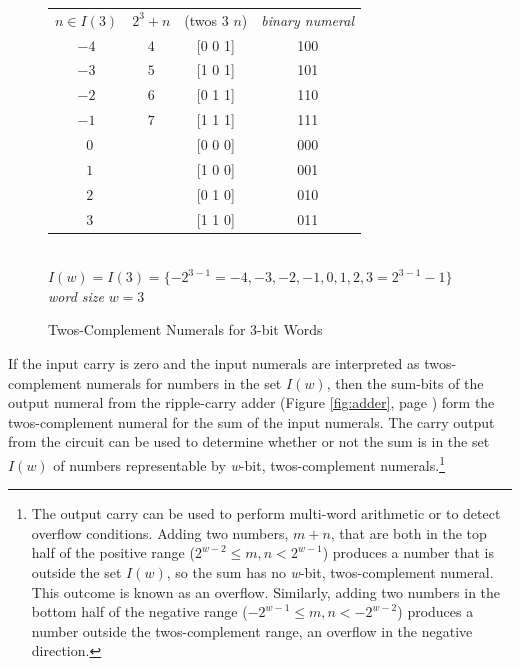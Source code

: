 \begin{figure}
\begin{center}
\begin{tabular}{cccc}
 $n \in I(3)$ & $2^3+n$  & \textsf{(twos $3$ $n$)}   & \emph{binary numeral} \\
 $-4$         & $4$      & \textsf{[0 0 1]}          & 100                   \\
 $-3$         & $5$      & \textsf{[1 0 1]}          & 101                   \\
 $-2$         & $6$      & \textsf{[0 1 1]}          & 110                   \\
 $-1$         & $7$      & \textsf{[1 1 1]}          & 111                   \\
 $~~0$        &          & \textsf{[0 0 0]}          & 000                   \\
 $~~1$        &          & \textsf{[1 0 0]}          & 001                   \\
 $~~2$        &          & \textsf{[0 1 0]}          & 010                   \\
 $~~3$        &          & \textsf{[1 1 0]}          & 011                   \\
\end{tabular}
\\ $I(w) = I(3) = \{-2^{3-1}=-4, -3, -2, -1, 0, 1, 2, 3=2^{3-1}-1\}$
\\ \emph{word size} $w = 3$
\end{center}
\caption{Twos-Complement Numerals for 3-bit Words}
\label{fig:2s-comp-3bit}
\end{figure}

If the input carry is zero and
the input numerals are interpreted
as twos-complement numerals for numbers in the set $I(w)$,
then the sum-bits of the output numeral from the ripple-carry adder
(Figure \ref{fig:adder}, page \pageref{fig:adder})
form the twos-complement numeral for the sum of the input numerals.
The carry output from the circuit can be used to determine
whether or not the sum is in the set $I(w)$ of numbers representable
by \emph{w}-bit, twos-complement numerals.\footnote{The
output carry can be used to perform multi-word arithmetic
or to detect overflow conditions. Adding two numbers, $m+n$,
that are both in the top half of the positive range
($2^{w-2} \leq m, n < 2^{w-1}$) produces a number that is
outside the set $I(w)$, so the sum has no \emph{w}-bit, twos-complement numeral.
This outcome is known as an overflow.
Similarly, adding two numbers in the bottom half of the
negative range ($-2^{w-1} \leq m,n < -2^{w-2}$)
produces a number outside the twos-complement range, an overflow in the negative direction.}

